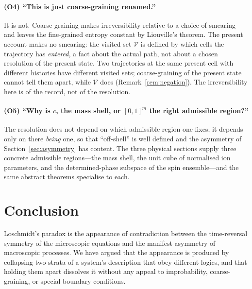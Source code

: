 \documentclass[11pt,a4paper]{article}
\theoremstyle{thmstyle}
\theoremstyle{definition}
\theoremstyle{remark}
\newcommand{\Vis}{\mathcal{V}}
\begin{document}
\paragraph{(O4) ``This is just coarse-graining renamed.''}
It is not. Coarse-graining \citep{gibbs1902} makes irreversibility relative
to a choice of smearing and leaves the fine-grained entropy constant by
Liouville's theorem. The present account makes no smearing: the visited set
$\Vis$ is defined by which cells the trajectory has \emph{entered}, a fact
about the actual path, not about a chosen resolution of the present state.
Two trajectories at the same present cell with different histories have
different visited sets; coarse-graining of the present state cannot tell
them apart, while $\Vis$ does (Remark~\ref{rem:negation}). The irreversibility
here is of the record, not of the resolution.

\paragraph{(O5) ``Why is $c$, the mass shell, or $[0,1]^m$ the right
admissible region?''}
The resolution does not depend on which admissible region one fixes; it
depends only on there \emph{being} one, so that ``off-shell'' is well
defined and the asymmetry of Section~\ref{sec:asymmetry} has content. The
three physical sections supply three concrete admissible regions---the mass
shell, the unit cube of normalised ion parameters, and the determined-phase
subspace of the spin ensemble---and the same abstract theorems specialise to
each.

\section{Conclusion}
\label{sec:conclusion}

Loschmidt's paradox is the appearance of contradiction between the
time-reversal symmetry of the microscopic equations and the manifest
asymmetry of macroscopic processes. We have argued that the appearance is
produced by collapsing two strata of a system's description that obey
different logics, and that holding them apart dissolves it without any
appeal to improbability, coarse-graining, or special boundary conditions.
\end{document}
